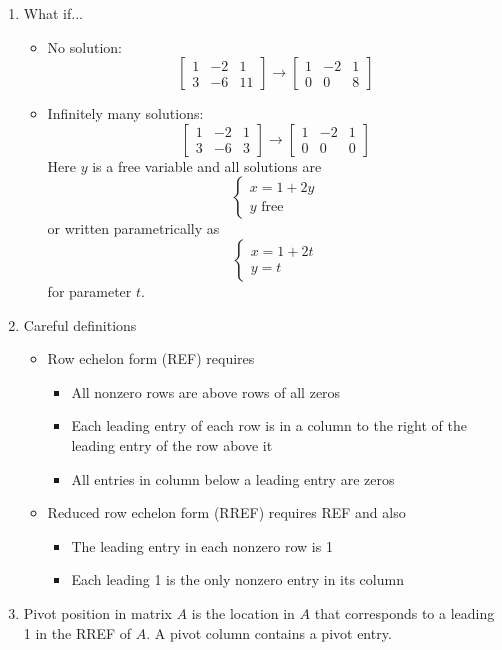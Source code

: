 \documentclass{article}
\begin{document}
\begin{enumerate}
\begin{enumerate}
\item What if...
\begin{itemize}

\item No solution:
\[
\left[
\begin{array} {cc|c}
1 & -2 & 1 \\
3 & -6 & 11
\end{array}
\right]
\rightarrow
\left[
\begin{array} {cc|c}
1 & -2 & 1 \\
0 & 0 & 8
\end{array}
\right]
\]

\item Infinitely many solutions:
\[
\left[
\begin{array} {cc|c}
1 & -2 & 1 \\
3 & -6 & 3
\end{array}
\right]
\rightarrow
\left[
\begin{array} {cc|c}
1 & -2 & 1 \\
0 & 0 & 0
\end{array}
\right]
\]
Here $y$ is a free variable and all solutions are
\[
\begin{cases}
x = 1+2y \\
y \text{ free}
\end{cases}
\]
or written parametrically as
\[
\begin{cases}
x = 1+2t \\
y = t
\end{cases}
\]
for parameter $t$.
\end{itemize}


\item Careful definitions
\begin{itemize}
\item Row echelon form (REF) requires
\begin{itemize}
\item All nonzero rows are above rows of all zeros
\item Each leading entry of each row is in a column to the right of the leading entry of the row above it
\item All entries in column below a leading entry are zeros
\end{itemize}
\item Reduced row echelon form (RREF) requires REF and also
\begin{itemize}
\item The leading entry in each nonzero row is 1
\item Each leading 1 is the only nonzero entry in its column
\end{itemize}
\end{itemize}
\item Pivot position in matrix $A$ is the location in $A$ that corresponds to a leading 1 in the RREF of $A$. A pivot column contains a pivot entry.



\end{enumerate}
\end{enumerate}
\end{document}
